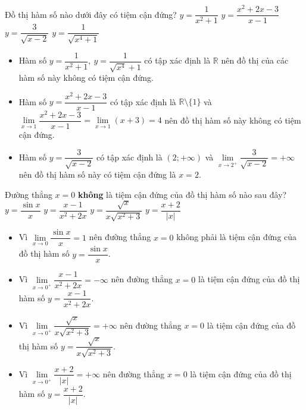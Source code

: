 \begin{ex}%
 Đồ thị hàm số nào dưới đây có tiệm cận đứng?
 \choice
  {$y=\dfrac{1}{x^2+1}$}
  {$y=\dfrac{x^2+2x-3}{x-1}$}
  {\True $y=\dfrac{3}{\sqrt{x-2}}$}
  {$y=\dfrac{1}{\sqrt{x^4+1}}$}
 \loigiai
  {
  \begin{itemize}
   \item Hàm số $y=\dfrac{1}{x^2+1},~y=\dfrac{1}{\sqrt{x^4}+1}$ có tập xác định là $\mathbb{R}$ nên đồ thị của các hàm số này không có tiệm cận đứng.
   \item Hàm số $y=\dfrac{x^2+2x-3}{x-1}$ có tập xác định là $\mathbb{R} \setminus \{1\}$ và $\lim\limits_{x \to 1} \dfrac{x^2+2x-3}{x-1}=\lim\limits_{x \to 1} \left(x+3\right)=4$	nên đồ thị hàm số này không có tiệm cận đứng.
   \item Hàm số $y=\dfrac{3}{\sqrt{x-2}}$ có tập xác định là $\left(2;+\infty\right)$ và $\lim\limits_{x \to 2^+} \dfrac{3}{\sqrt{x-2}} =+\infty$	nên đồ thị hàm số này có tiệm cận đứng là $x=2$.
  \end{itemize}
  }
\end{ex}

\begin{ex}%
 Đường thẳng $x=0$ {\bf không} là tiệm cận đứng của đồ thị hàm số nào sau đây?
 \choice
  {\True $y=\dfrac{\sin x}{x}$}
  {$y=\dfrac{x-1}{x^2+2x}$}
  {$y=\dfrac{\sqrt{x}}{x\sqrt{x^2+3}}$}
  {$y=\dfrac{x+2}{|x|}$}
 \loigiai
  {
  \begin{itemize}
   \item Vì $\lim\limits_{x\to 0}\dfrac{\sin x}{x}=1$ nên đường thẳng $x=0$ không phải là tiệm cận đứng của đồ thị hàm số $y=\dfrac{\sin x}{x}$.
   \item Vì $\lim\limits_{x\to 0^+}\dfrac{x-1}{x^2+2x}=-\infty$ nên đường thẳng $x=0$ là tiệm cận đứng của đồ thị hàm số $y=\dfrac{x-1}{x^2+2x}$.
   \item Vì $\lim\limits_{x\to 0^+}\dfrac{\sqrt{x}}{x\sqrt{x^2+3}}=+\infty$ nên đường thẳng $x=0$ là tiệm cận đứng của đồ thị hàm số $y=\dfrac{\sqrt{x}}{x\sqrt{x^2+3}}$.
   \item Vì $\lim\limits_{x\to 0^+}\dfrac{x+2}{|x|}=+\infty$ nên đường thẳng $x=0$ là tiệm cận đứng của đồ thị hàm số $y=\dfrac{x+2}{|x|}$.
  \end{itemize}
  }
\end{ex}

